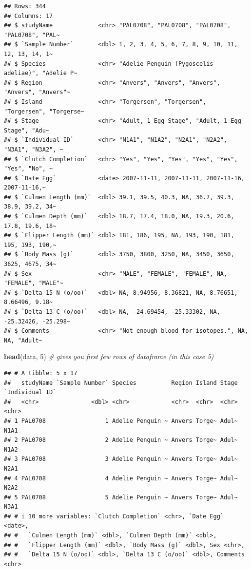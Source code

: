 \documentclass[
]{article}
\newenvironment{Shaded}{\begin{snugshade}}{\end{snugshade}}
\newcommand{\CommentTok}[1]{\textcolor[rgb]{0.56,0.35,0.01}{\textit{#1}}}
\newcommand{\DecValTok}[1]{\textcolor[rgb]{0.00,0.00,0.81}{#1}}
\newcommand{\FunctionTok}[1]{\textcolor[rgb]{0.13,0.29,0.53}{\textbf{#1}}}
\newcommand{\NormalTok}[1]{#1}
\begin{document}
\begin{verbatim}
## Rows: 344
## Columns: 17
## $ studyName             <chr> "PAL0708", "PAL0708", "PAL0708", "PAL0708", "PAL~
## $ `Sample Number`       <dbl> 1, 2, 3, 4, 5, 6, 7, 8, 9, 10, 11, 12, 13, 14, 1~
## $ Species               <chr> "Adelie Penguin (Pygoscelis adeliae)", "Adelie P~
## $ Region                <chr> "Anvers", "Anvers", "Anvers", "Anvers", "Anvers"~
## $ Island                <chr> "Torgersen", "Torgersen", "Torgersen", "Torgerse~
## $ Stage                 <chr> "Adult, 1 Egg Stage", "Adult, 1 Egg Stage", "Adu~
## $ `Individual ID`       <chr> "N1A1", "N1A2", "N2A1", "N2A2", "N3A1", "N3A2", ~
## $ `Clutch Completion`   <chr> "Yes", "Yes", "Yes", "Yes", "Yes", "Yes", "No", ~
## $ `Date Egg`            <date> 2007-11-11, 2007-11-11, 2007-11-16, 2007-11-16,~
## $ `Culmen Length (mm)`  <dbl> 39.1, 39.5, 40.3, NA, 36.7, 39.3, 38.9, 39.2, 34~
## $ `Culmen Depth (mm)`   <dbl> 18.7, 17.4, 18.0, NA, 19.3, 20.6, 17.8, 19.6, 18~
## $ `Flipper Length (mm)` <dbl> 181, 186, 195, NA, 193, 190, 181, 195, 193, 190,~
## $ `Body Mass (g)`       <dbl> 3750, 3800, 3250, NA, 3450, 3650, 3625, 4675, 34~
## $ Sex                   <chr> "MALE", "FEMALE", "FEMALE", NA, "FEMALE", "MALE"~
## $ `Delta 15 N (o/oo)`   <dbl> NA, 8.94956, 8.36821, NA, 8.76651, 8.66496, 9.18~
## $ `Delta 13 C (o/oo)`   <dbl> NA, -24.69454, -25.33302, NA, -25.32426, -25.298~
## $ Comments              <chr> "Not enough blood for isotopes.", NA, NA, "Adult~
\end{verbatim}

\begin{Shaded}
\begin{Highlighting}[]
\FunctionTok{head}\NormalTok{(data, }\DecValTok{5}\NormalTok{) }\CommentTok{\# gives you first few rows of dataframe (in this case 5)}
\end{Highlighting}
\end{Shaded}

\begin{verbatim}
## # A tibble: 5 x 17
##   studyName `Sample Number` Species          Region Island Stage `Individual ID`
##   <chr>               <dbl> <chr>            <chr>  <chr>  <chr> <chr>          
## 1 PAL0708                 1 Adelie Penguin ~ Anvers Torge~ Adul~ N1A1           
## 2 PAL0708                 2 Adelie Penguin ~ Anvers Torge~ Adul~ N1A2           
## 3 PAL0708                 3 Adelie Penguin ~ Anvers Torge~ Adul~ N2A1           
## 4 PAL0708                 4 Adelie Penguin ~ Anvers Torge~ Adul~ N2A2           
## 5 PAL0708                 5 Adelie Penguin ~ Anvers Torge~ Adul~ N3A1           
## # i 10 more variables: `Clutch Completion` <chr>, `Date Egg` <date>,
## #   `Culmen Length (mm)` <dbl>, `Culmen Depth (mm)` <dbl>,
## #   `Flipper Length (mm)` <dbl>, `Body Mass (g)` <dbl>, Sex <chr>,
## #   `Delta 15 N (o/oo)` <dbl>, `Delta 13 C (o/oo)` <dbl>, Comments <chr>
\end{verbatim}
\end{document}
